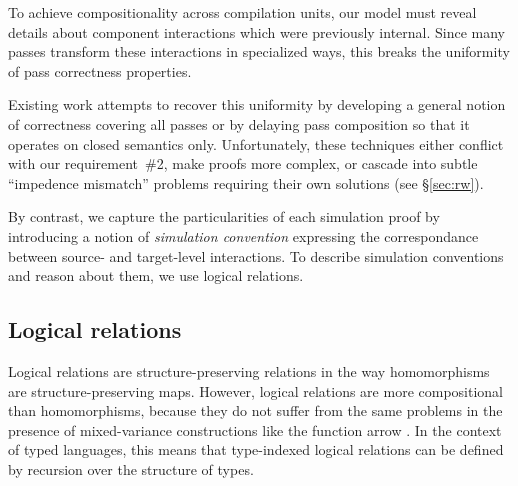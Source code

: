 \documentclass[acmsmall,screen,review,anonymous]{acmart}
\begin{document}
To achieve compositionality across compilation units,
our model must reveal details
about component interactions
which were previously internal.
Since many passes transform
these interactions in
specialized ways,
this breaks the uniformity
of pass correctness properties.

Existing work attempts to recover this uniformity
by developing a general notion of correctness
covering all passes
or by delaying pass composition so that
it operates on closed semantics only.
Unfortunately, these techniques either
conflict with our requirement~\#2,
make proofs more complex,
or cascade into subtle ``impedence mismatch'' problems
requiring their own solutions
(see \S\ref{sec:rw}).

By contrast,
we capture the particularities of each simulation proof
by introducing a notion of \emph{simulation convention}
expressing the correspondance between
source- and target-level interactions.
To describe simulation conventions
and reason about them,
we use logical relations.



\subsection{Logical relations} \label{sec:logrel} %

Logical relations are structure-preserving relations
in the way homomorphisms are structure-preserving maps.
However,
logical relations are more compositional than homomorphisms,
because they do not suffer from the same problems
in the presence of mixed-variance constructions
like the function arrow %
\cite{lrp}.
In the context of typed languages,
this means that type-indexed logical relations
can be defined by recursion over the structure of types.

\end{document}
